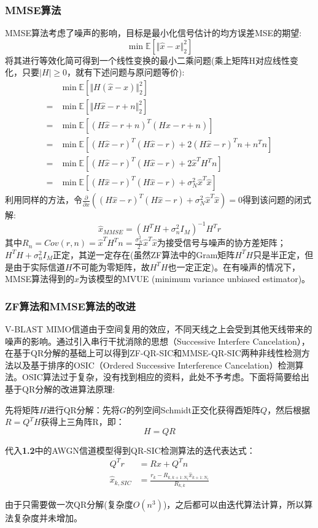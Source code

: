 \subsubsection{MMSE算法}
MMSE算法考虑了噪声的影响，目标是最小化信号估计的均方误差MSE的期望:
\[
\min\mathbb{E}\left[\Vert\hat{x}-x\Vert_2^2\right]
\]
将其进行等效化简可得到一个线性变换的最小二乘问题(乘上矩阵H对应线性变化，只要$\vert H\vert\geq 0$，就有下述问题与原问题等价):
\[
\begin{aligned}
&\min\mathbb{E}\left[\Vert H(\hat{x}-x)\Vert_2^2\right]\\
=&\min\mathbb{E}\left[\Vert H\hat{x}-r+n\Vert_2^2\right]\\
=&\min\mathbb{E}\left[(H\hat{x}-r+n)^T(H\hat{x}-r+n)\right]\\
=&\min\mathbb{E}\left[(H\hat{x}-r)^T(H\hat{x}-r)+2(H\hat{x}-r)^Tn+n^Tn\right]\\
=&\min\mathbb{E}\left[(H\hat{x}-r)^T(H\hat{x}-r)+2\hat{x}^TH^Tn\right]\\
=&\min\mathbb{E}\left[(H\hat{x}-r)^T(H\hat{x}-r)+\sigma_N^2\hat{x}^T\hat{x}\right]
\end{aligned}
\]
利用同样的方法，令$\frac{\partial}{\partial \hat{x}}((H\hat{x}-r)^T(H\hat{x}-r)+\sigma_N^2\hat{x}^T\hat{x})=0$得到该问题的闭式解:
\[
\hat{x}_{MMSE}=(H^TH+\sigma_n^2I_M)^{-1}H^Tr
\]
其中$R_n=Cov(r,n)=\hat{x}^TH^Tn=\frac{\sigma_N^2}{2}\hat{x}^T\hat{x}$为接受信号与噪声的协方差矩阵；$H^TH+\sigma_n^2I_M$正定，其逆一定存在(虽然ZF算法中的Gram矩阵$H^TH$只是半正定，但是由于实际信道$H$不可能为零矩阵，故$H^TH$也一定正定)。在有噪声的情况下，MMSE算法得到的$\hat{x}$为该模型的MVUE (minimum variance unbiased estimator)。\par

\subsubsection{ZF算法和MMSE算法的改进}
V-BLAST MIMO信道由于空间复用的效应，不同天线之上会受到其他天线带来的噪声的影响。通过引入串行干扰消除的思想（Successive Interfere Cancelation），在基于QR分解的基础上可以得到ZF-QR-SIC和MMSE-QR-SIC两种非线性检测方法以及基于排序的OSIC（Ordered Successive Interference Cancelation）检测算法。OSIC算法过于复杂，没有找到相应的资料，此处不予考虑。下面将简要给出基于QR分解的改进算法原理:\par
先将矩阵$H$进行QR分解：先将$G$的列空间Schmidt正交化获得酉矩阵$Q$，然后根据$R=Q^TH$获得上三角阵R，即：
\[
H=QR
\]\par
代入\textbf{1.2}中的AWGN信道模型得到QR-SIC检测算法的迭代表达式：
\[
\begin{aligned}
Q^Tr&=Rx+Q^Tn\\
\hat{x}_{k,SIC}&=\frac{r_k-R_{k,k+1:N_t}\hat{x}_{k+1:N_t}}{R_{k,k}}
\end{aligned}
\]\par
由于只需要做一次QR分解(复杂度$O(n^3)$)，之后都可以由迭代算法计算，所以算法复杂度并未增加。